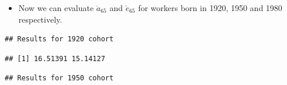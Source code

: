 \begin{frame}[fragile]

\begin{itemize}[<+->]
\itemsep1pt\parskip0pt
\item
  Now we can evaluate \(\ddot{a}_{65}\) and \(\mathring{e}_{65}\) for
  workers born in 1920, 1950 and 1980 respectively.
\end{itemize}

\begin{Shaded}
\begin{Highlighting}[]
\NormalTok{(}\NormalTok{,}\NormalTok{)}
\end{Highlighting}
\end{Shaded}

\begin{verbatim}
## Results for 1920 cohort
\end{verbatim}

\begin{Shaded}
\begin{Highlighting}[]
\NormalTok{(}\NormalTok{),}\NormalTok{))}
\end{Highlighting}
\end{Shaded}

\begin{verbatim}
## [1] 16.51391 15.14127
\end{verbatim}

\begin{Shaded}
\begin{Highlighting}[]
\NormalTok{(}\NormalTok{,}\NormalTok{)}
\end{Highlighting}
\end{Shaded}

\begin{verbatim}
## Results for 1950 cohort
\end{verbatim}

\begin{Shaded}
\begin{Highlighting}[]
\NormalTok{(}\NormalTok{),}\NormalTok{))}
\end{Highlighting}
\end{Shaded}


\end{frame}
